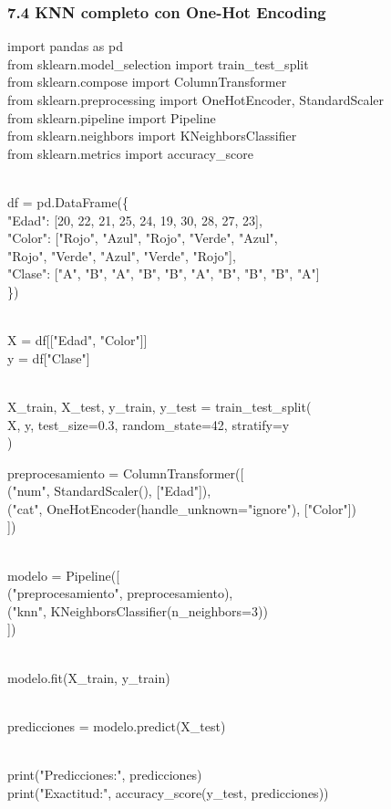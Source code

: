 \documentclass[]{article}
\begin{document}
\subsubsection{7.4 KNN completo con One-Hot
Encoding}\label{knn-completo-con-one-hot-encoding}

import pandas as pd\\
from sklearn.model\_selection import train\_test\_split\\
from sklearn.compose import ColumnTransformer\\
from sklearn.preprocessing import OneHotEncoder, StandardScaler\\
from sklearn.pipeline import Pipeline\\
from sklearn.neighbors import KNeighborsClassifier\\
from sklearn.metrics import accuracy\_score\\
\strut \\
df = pd.DataFrame(\{\\
"Edad": {[}20, 22, 21, 25, 24, 19, 30, 28, 27, 23{]},\\
"Color": {[}"Rojo", "Azul", "Rojo", "Verde", "Azul",\\
"Rojo", "Verde", "Azul", "Verde", "Rojo"{]},\\
"Clase": {[}"A", "B", "A", "B", "B", "A", "B", "B", "B", "A"{]}\\
\})\\
\strut \\
X = df{[}{[}"Edad", "Color"{]}{]}\\
y = df{[}"Clase"{]}\\
\strut \\
X\_train, X\_test, y\_train, y\_test = train\_test\_split(\\
X, y, test\_size=0.3, random\_state=42, stratify=y\\
)

preprocesamiento = ColumnTransformer({[}\\
("num", StandardScaler(), {[}"Edad"{]}),\\
("cat", OneHotEncoder(handle\_unknown="ignore"), {[}"Color"{]})\\
{]})\\
\strut \\
modelo = Pipeline({[}\\
("preprocesamiento", preprocesamiento),\\
("knn", KNeighborsClassifier(n\_neighbors=3))\\
{]})\\
\strut \\
modelo.fit(X\_train, y\_train)\\
\strut \\
predicciones = modelo.predict(X\_test)\\
\strut \\
print("Predicciones:", predicciones)\\
print("Exactitud:", accuracy\_score(y\_test, predicciones))
\end{document}
